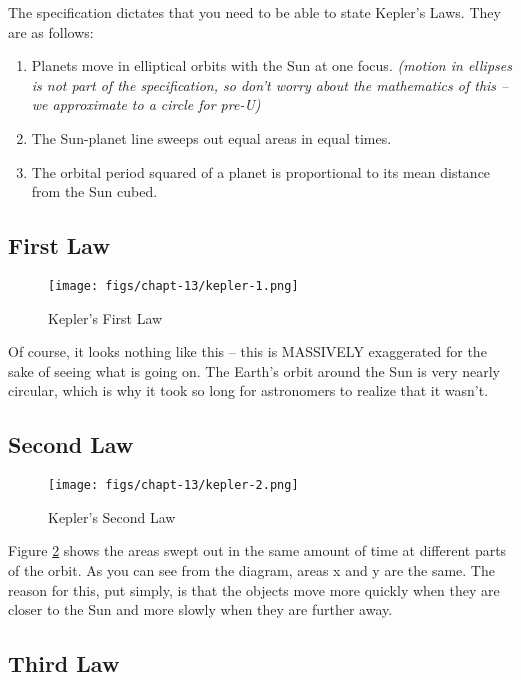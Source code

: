 \documentclass[a4paper,11pt,twoside]{memoir}
\newcounter{spec}[chapter]
\begin{document}
The specification dictates that you need to be able to state Kepler's
Laws. They are as follows:
\begin{enumerate}
\item
  Planets move in elliptical orbits with the Sun at one focus.
  \emph{(motion in ellipses is not part of the specification, so don't
  worry about the mathematics of this -- we approximate to a circle for
  pre-U)}
\item
  The Sun-planet line sweeps out equal areas in equal times.
\item
  The orbital period squared of a planet is proportional to its mean
  distance from the Sun cubed.
\end{enumerate}
\newpage
\subsection{First Law}
\begin{figure}[h]
  \begin{center}
  \texttt{[image: figs/chapt-13/kepler-1.png]}
\end{center}
  \caption{Kepler's First Law}
  \label{kepler-1}
\end{figure}

Of course, it looks nothing like this -- this is MASSIVELY exaggerated
for the sake of seeing what is going on. The Earth's orbit around the
Sun is very nearly circular, which is why it took so long for
astronomers to realize that it wasn't.

\subsection{Second Law}

\begin{figure}[h]
  \begin{center}
    \texttt{[image: figs/chapt-13/kepler-2.png]}
  \end{center}
  \caption{Kepler's Second Law}
  \label{kepler-2}
\end{figure}

Figure \ref{kepler-2} shows the areas swept out in the same amount of time at different parts of the orbit. As you can see from the diagram, areas x and y are the same. The reason
for this, put simply, is that the objects move more quickly when they
are closer to the Sun and more slowly when they are further away.

\subsection{Third Law}
\end{document}
